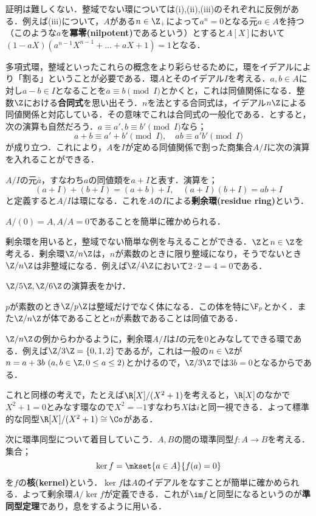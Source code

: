 証明は難しくない．整域でない環については(i),(ii),(iii)のそれぞれに反例がある．例えば(iii)について，$A$がある$n\in\Z_+$によって$a^n=0$となる元$a\in A$を持つ（このような$a$を\textbf{冪零(nilpotent)}であるという）とすると$A[X]$において$(1-aX)(a^{n-1}X^{n-1}+\dots+aX+1)=1$となる．

多項式環，整域といったこれらの概念をより彩らせるために，環をイデアルにより「割る」ということが必要である．環$A$とそのイデアル$I$を考える．$a,b\in A$に対し$a-b\in I$となることを$a\equiv b \pmod I$とかくと，これは同値関係になる．整数$\Z$における\textbf{合同式}を思い出そう．$n$を法とする合同式は，イデアル$n\Z$による同値関係と対応している．その意味でこれは合同式の一般化である．とすると，次の演算も自然だろう．$a\equiv a',b\equiv b'\pmod I$なら；
\[a+b\equiv a'+b'\pmod I,\quad ab\equiv a'b'\pmod I\]
が成り立つ．これにより，$A$を$I$が定める同値関係で割った商集合$A/I$に次の演算を入れることができる．

\begin{defi}[剰余環]
	$A/I$の元$\bar{a}$，すなわち$a$の同値類を$a+I$と表す．演算を；
	\[(a+I)+(b+I)=(a+b)+I,\quad (a+I)(b+I)=ab+I\]
	と定義すると$A/I$は環になる．これを$A$の$I$による\textbf{剰余環(residue ring)}という．
\end{defi}

$A/(0)=A, A/A=0$であることを簡単に確かめられる．

剰余環を用いると，整域でない簡単な例を与えることができる．$\Z$と$n\in\Z$を考える．剰余環$\Z/n\Z$は，$n$が素数のときに限り整域になり，そうでないとき$\Z/n\Z$は非整域になる．例えば$\Z/4\Z$において$2\cdot 2=4=0$である．

\begin{exer}
	$\Z/5\Z, \Z/6\Z$の演算表をかけ．
\end{exer}

$p$が素数のとき$\Z/p\Z$は整域だけでなく体になる．この体を特に$\F_p$とかく．また$\Z/n\Z$が体であることと$n$が素数であることは同値である．

$\Z/n\Z$の例からわかるように，剰余環$A/I$は$I$の元を0とみなしてできる環である．例えば$\Z/3\Z=\{0,1,2\}$であるが，これは一般の$n\in\Z$が$n=a+3b~(a,b\in\Z, 0\leq a\leq 2)$とかけるので，$\Z/3\Z$では$3b=0$となるからである．

これと同様の考えで，たとえば$\R[X]/(X^2+1)$を考えると，$\R[X]$のなかで$X^2+1=0$とみなす環なので$X^2=-1$すなわち$X$は$i$と同一視できる．よって標準的な同型$\R[X]/(X^2+1)\cong\Co$がある．

次に環準同型について着目していこう．$A,B$の間の環準同型$f:A\to B$を考える．集合；
\[\ker f=\mkset{a\in A}{f(a)=0}\]
を$f$の\textbf{核(kernel)}という．$\ker f$は$A$のイデアルをなすことが簡単に確かめられる．よって剰余環$A/\ker f$が定義できる．これが$\im f$と同型になるというのが\textbf{準同型定理}であり，息をするように用いる．

